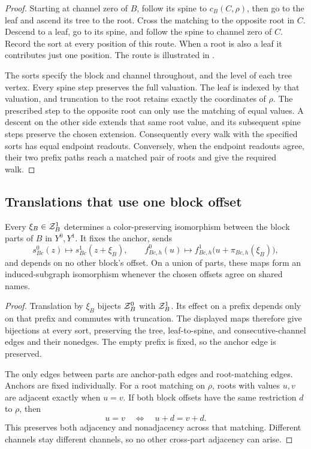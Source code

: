 \begin{proof}
Starting at channel zero of \(B\), follow its spine to
\(c_B(C,\rho)\), then go to the leaf and ascend its tree to the root.
Cross the matching to the opposite root in \(C\).
Descend to a leaf, go to its spine, and follow the spine to channel
zero of \(C\).
Record the sort at every position of this route.
When a root is also a leaf it contributes just one position.
The route is illustrated in .

The sorts specify the block and channel throughout, and the level
of each tree vertex.  Every spine step preserves the full valuation.
The leaf is indexed by that valuation, and truncation to the root
retains exactly the coordinates of \(\rho\).
The prescribed step to the opposite root can only use the matching
of equal values.  A descent on the other side extends that same root
value, and its subsequent spine steps preserve the chosen extension.
Consequently every walk with the specified sorts has equal endpoint
readouts.  Conversely, when the endpoint readouts agree, their two
prefix paths reach a matched pair of roots and give the required walk.
\end{proof}



\subsection{Translations that use one block offset}

\begin{lemma}
\label{graph:colored-translations}
Every \(\xi_B\in\mathcal Z_B^1\) determines a color-preserving isomorphism
between the block parts of \(B\) in \(Y^0,Y^1\).
It fixes the anchor, sends
\[
 s_{Bc}^0(z)\longmapsto s_{Bc}^1(z+\xi_B),
 \qquad
 f_{Bc,h}^0(u)\longmapsto
 f_{Bc,h}^1\bigl(u+\pi_{Bc,h}(\xi_B)\bigr),
\]
and depends on no other block's offset.
On a union of parts, these maps form an induced-subgraph
isomorphism whenever the chosen offsets agree on shared names.
\end{lemma}

\begin{proof}
Translation by \(\xi_B\) bijects \(\mathcal Z_B^0\) with \(\mathcal Z_B^1\).
Its effect on a prefix depends only on that prefix and commutes with
truncation.  The displayed maps therefore give bijections at every
sort, preserving the tree, leaf-to-spine, and consecutive-channel
edges and their nonedges.
The empty prefix is fixed, so the anchor edge is preserved.

The only edges between parts are anchor-path edges and root-matching
edges.  Anchors are fixed individually.
For a root matching on \(\rho\), roots with values \(u,v\) are
adjacent exactly when \(u=v\).
If both block offsets have the same restriction \(d\) to \(\rho\),
then
\[
                       u=v\quad\Longleftrightarrow\quad u+d=v+d.
\]
This preserves both adjacency and nonadjacency across that matching.
Different channels stay different channels, so no other cross-part
adjacency can arise.
\end{proof}

